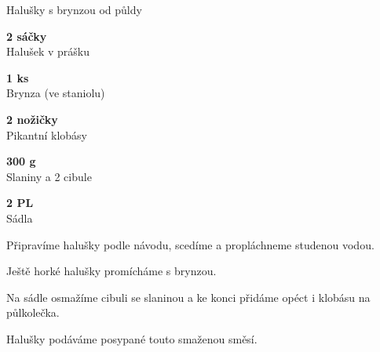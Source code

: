 \documentclass[11pt,a4paper]{article}
\begin{document}
\begin{recipe}[RawSienna]{Halušky s brynzou od půldy}
    \begin{ingredients}
        \item \parbox[t]{\linewidth}{\raggedright \piece \textbf{2 sáčky}\\ Halušek v prášku}
        \item \parbox[t]{\linewidth}{\raggedright \weight \textbf{1 ks}\\ Brynza (ve staniolu)}
        \item \parbox[t]{\linewidth}{\raggedright \piece \textbf{2 nožičky}\\ Pikantní klobásy}
        \item \parbox[t]{\linewidth}{\raggedright \weight \textbf{300 g}\\ Slaniny a 2 cibule}
        \item \parbox[t]{\linewidth}{\raggedright \spoon \textbf{2 PL}\\ Sádla}
    \end{ingredients}
    \begin{steps}
        \item Připravíme halušky podle návodu, scedíme a propláchneme studenou vodou.
        \item Ještě horké halušky promícháme s brynzou.
        \item Na sádle osmažíme cibuli se slaninou a ke konci přidáme opéct i klobásu na půlkolečka.
        \item Halušky podáváme posypané touto smaženou směsí.
    \end{steps}
\end{recipe}
\end{document}

